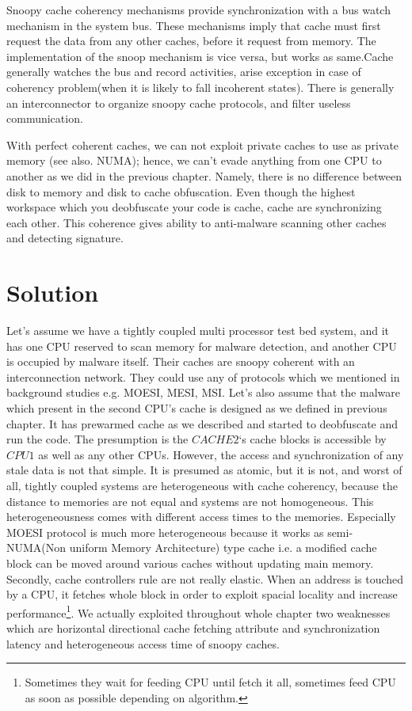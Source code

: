 Snoopy cache coherency mechanisms provide synchronization with a bus watch mechanism in the system bus. These mechanisms imply that cache must first request the data from any other caches, before it request from memory. The implementation of the snoop mechanism is vice versa, but works as same.Cache generally watches the bus and record activities, arise exception in case of coherency problem(when it is likely to fall incoherent states). There is generally an interconnector to organize snoopy cache protocols, and filter useless communication. 

With perfect coherent caches, we can not exploit private caches to use as private memory (see also. NUMA); hence, we can't evade anything from one CPU to another as we did in the previous chapter. Namely, there is no difference between disk to memory and disk to cache obfuscation. Even though the highest workspace which you deobfuscate your code is cache, cache are synchronizing each other. This coherence gives ability to anti-malware scanning other caches and detecting signature.
\section{Solution}
	Let's assume we have a tightly coupled multi processor test bed system, and it has one CPU reserved to scan memory for malware detection, and another CPU is occupied by malware itself. Their caches are snoopy coherent with an interconnection network.  They could use any of protocols which we mentioned in background studies e.g. MOESI, MESI, MSI. Let's also assume that the malware which present in the second CPU's cache is designed as we defined in previous chapter. It has prewarmed cache as we described and started to deobfuscate and run the code. The presumption is the $CACHE 2$`s cache blocks is accessible by $CPU1$ as well as any other CPUs. However, the access and synchronization of any stale data is not that simple. It is presumed as atomic, but it is not, and worst of all, tightly coupled systems are heterogeneous with cache coherency, because the distance to memories are not equal and systems are not homogeneous. This heterogeneousness comes with different access times to the memories. Especially MOESI protocol is much more heterogeneous because it works as semi-NUMA(Non uniform Memory Architecture) type cache i.e. a modified cache block can be moved around various caches without updating main memory. Secondly, cache controllers rule are not really elastic. When an address is touched by a CPU, it fetches whole block in order to exploit spacial locality and increase performance\footnote{Sometimes they wait for feeding CPU until fetch it all, sometimes feed CPU as soon as possible depending on algorithm.}. We actually exploited throughout whole chapter two weaknesses which are horizontal directional cache fetching attribute and synchronization latency and heterogeneous access time of snoopy caches.
